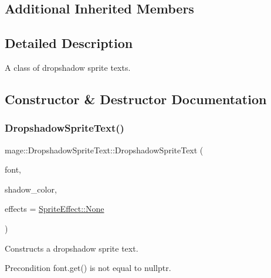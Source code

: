\subsection*{Additional Inherited Members}


\subsection{Detailed Description}
A class of dropshadow sprite texts. 

\subsection{Constructor \& Destructor Documentation}
\hypertarget{classmage_1_1_dropshadow_sprite_text_af9580cd770e5dad0b3d5a9299c0a7522}{}\label{classmage_1_1_dropshadow_sprite_text_af9580cd770e5dad0b3d5a9299c0a7522} 
\subsubsection{\texorpdfstring{Dropshadow\+Sprite\+Text()}{DropshadowSpriteText()}\hspace{0.1cm}{\footnotesize\ttfamily [1/4]}}
{\footnotesize\ttfamily mage\+::\+Dropshadow\+Sprite\+Text\+::\+Dropshadow\+Sprite\+Text (\begin{DoxyParamCaption}\item[{\hyperlink{namespacemage_a1e01ae66713838a7a67d30e44c67703e}{Shared\+Ptr}$<$ \hyperlink{classmage_1_1_sprite_font}{Sprite\+Font} $>$}]{font,  }\item[{const \hyperlink{structmage_1_1_color}{Color} \&}]{shadow\+\_\+color,  }\item[{\hyperlink{namespacemage_a9cfe18123066ba4236f548f9de75d881}{Sprite\+Effect}}]{effects = {\ttfamily \hyperlink{namespacemage_a5e7e18b0154373ce8fc942fe3f6b27fda6adf97f83acf6453d4a6a4b1070f3754}{Sprite\+Effect\+::\+None}} }\end{DoxyParamCaption})\hspace{0.3cm}{\ttfamily [explicit]}}

Constructs a dropshadow sprite text.

\begin{DoxyPrecond}{Precondition}
{\ttfamily font.\+get()} is not equal to {\ttfamily nullptr}. 
\end{DoxyPrecond}

